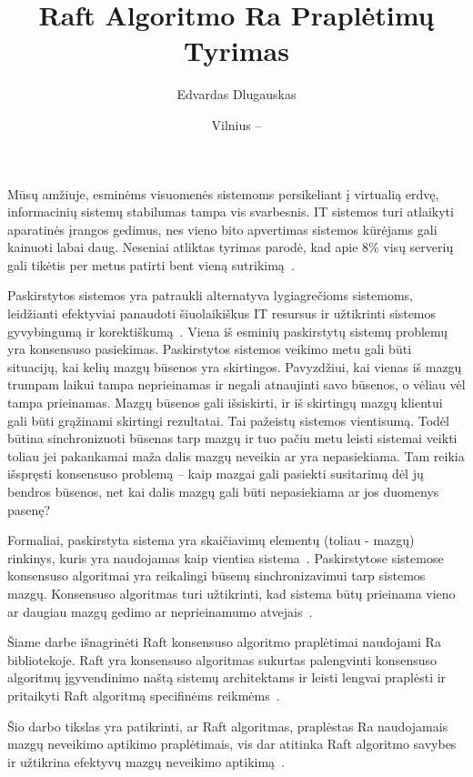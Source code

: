 \documentclass{VUMIFPSkursinis}
\title{Raft Algoritmo Ra Praplėtimų Tyrimas}
\author{Edvardas Dlugauskas}
\date{Vilnius – \the\year}
\begin{document}
\maketitle
\tableofcontents


Mūsų amžiuje, esminėms visuomenės sistemoms persikeliant į virtualią erdvę, informacinių sistemų stabilumas tampa vis svarbesnis. IT sistemos turi atlaikyti aparatinės įrangos gedimus, nes vieno bito apvertimas sistemos kūrėjams gali kainuoti labai daug. Neseniai atliktas tyrimas parodė, kad apie 8\% visų serverių gali tikėtis per metus patirti bent vieną sutrikimą~\cite{characterizing_cloud_hardware_rel}.

Paskirstytos sistemos yra patraukli alternatyva lygiagrečioms sistemoms, leidžianti efektyviai panaudoti šiuolaikiškus IT resursus ir užtikrinti sistemos gyvybingumą ir korektiškumą~\cite{steen_distributed_2017, ongaro_consensus}. Viena iš esminių paskirstytų sistemų problemų yra konsensuso pasiekimas. Paskirstytos sistemos veikimo metu gali būti situacijų, kai kelių mazgų būsenos yra skirtingos. Pavyzdžiui, kai vienas iš mazgų trumpam laikui tampa neprieinamas ir negali atnaujinti savo būsenos, o vėliau vėl tampa prieinamas. Mazgų būsenos gali išsiskirti, ir iš skirtingų mazgų klientui gali būti grąžinami skirtingi rezultatai. Tai pažeistų sistemos vientisumą. Todėl būtina sinchronizuoti būsenas tarp mazgų ir tuo pačiu metu leisti sistemai veikti toliau jei pakankamai maža dalis mazgų neveikia ar yra nepasiekiama. Tam reikia išspręsti konsensuso problemą -- kaip mazgai gali pasiekti susitarimą dėl jų bendros būsenos, net kai dalis mazgų gali būti nepasiekiama ar jos duomenys pasenę?

Formaliai, paskirstyta sistema yra skaičiavimų elementų (toliau - mazgų) rinkinys, kuris yra naudojamas kaip vientisa sistema~\cite{steen_distributed_2017}. Paskirstytose sistemose konsensuso algoritmai yra reikalingi būsenų sinchronizavimui tarp sistemos mazgų. Konsensuso algoritmas turi užtikrinti, kad sistema būtų prieinama vieno ar daugiau mazgų gedimo ar neprieinamumo atvejais~\cite{ongaro_consensus}. 

Šiame darbe išnagrinėti Raft konsensuso algoritmo praplėtimai naudojami Ra bibliotekoje. Raft yra konsensuso algoritmas sukurtas palengvinti konsensuso algoritmų įgyvendinimo naštą sistemų architektams ir leisti lengvai praplėsti ir pritaikyti Raft algoritmą specifinėms reikmėms~\cite{ongaro_consensus}. 

Šio darbo tikslas yra patikrinti, ar Raft algoritmas, praplėstas Ra naudojamais mazgų neveikimo aptikimo praplėtimais, vis dar atitinka Raft algoritmo savybes ir užtikrina efektyvų mazgų neveikimo aptikimą~\cite{ongaro_consensus, rabbitmqra}.
\end{document}
